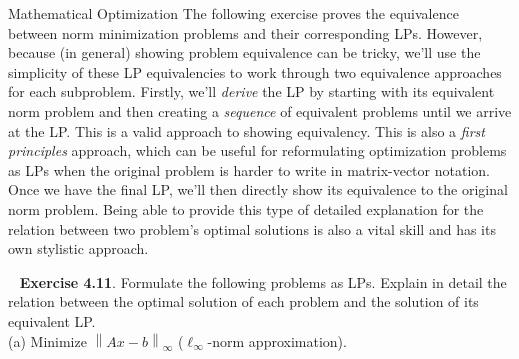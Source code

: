 \begin{chapter}{Mathematical Optimization}
    The following exercise proves the equivalence between norm minimization problems and their
    corresponding LPs. However, because (in general) showing problem equivalence can be tricky,
    we'll use the simplicity of these LP equivalencies to work through two equivalence approaches for each subproblem. Firstly, we'll \textit{derive}
    the LP by starting with its equivalent norm problem and then creating a \textit{sequence} of equivalent problems
    until we arrive at the LP. This is a valid approach to showing equivalency. This is also a
    \textit{first principles} approach, which can be useful for reformulating optimization problems as LPs
    when the original problem is harder to write in matrix-vector notation.
    Once we have the final LP, we'll then directly show its equivalence to the original norm problem. 
    Being able to provide this type of detailed explanation for the relation between two problem's optimal solutions
    is also a vital skill %
    and has its own stylistic approach.
    
    \noindent ~\cite{boyd_convex_optimization} \textbf{Exercise 4.11}. Formulate the following problems as LPs.
    Explain in detail the relation between the optimal solution of each problem and the solution of its equivalent LP.\\
    (a) Minimize $\left\lVert Ax - b \right\rVert_{\infty}$ ($\ell_\infty$-norm approximation).
    

\end{chapter}

